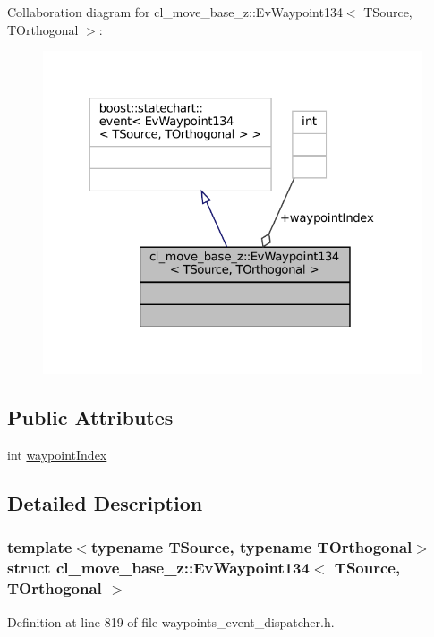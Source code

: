 Collaboration diagram for cl\+\_\+move\+\_\+base\+\_\+z\+:\+:Ev\+Waypoint134$<$ T\+Source, T\+Orthogonal $>$\+:
\nopagebreak
\begin{figure}[H]
\begin{center}
\leavevmode
\includegraphics[width=324pt]{structcl__move__base__z_1_1EvWaypoint134__coll__graph}
\end{center}
\end{figure}
\subsection*{Public Attributes}
\begin{DoxyCompactItemize}
\item 
int \hyperlink{structcl__move__base__z_1_1EvWaypoint134_ad1365a0535f1b315b48e3d0c4e139c08}{waypoint\+Index}
\end{DoxyCompactItemize}


\subsection{Detailed Description}
\subsubsection*{template$<$typename T\+Source, typename T\+Orthogonal$>$\newline
struct cl\+\_\+move\+\_\+base\+\_\+z\+::\+Ev\+Waypoint134$<$ T\+Source, T\+Orthogonal $>$}



Definition at line 819 of file waypoints\+\_\+event\+\_\+dispatcher.\+h.



